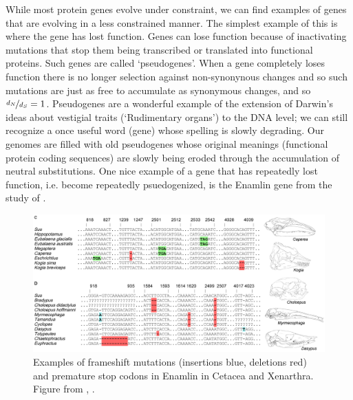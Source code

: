 While most protein genes evolve under constraint, we can find examples of
genes that are evolving in a less constrained manner. The simplest
example of this is where the gene has lost function. Genes can lose function because of inactivating mutations that stop them being transcribed or translated into functional proteins. Such genes are called `pseudogenes'.
When a gene completely loses function there is no longer
selection against non-synonynous changes and so such mutations are just as free
to accumulate as synonymous changes, and so $\nicefrac{d_N}{d_S}=1$.
Pseudogenes are a wonderful example of the extension of Darwin's ideas about vestigial traits (`Rudimentary organs') to the DNA level;
we can still recognize a once useful word (gene) whose spelling is slowly degrading. Our genomes are filled with old pseudogenes whose
original meanings (functional protein coding sequences) are slowly being eroded through the accumulation of neutral substitutions.
One nice example of a gene that has repeatedly lost function,
i.e. become repeatedly psuedogenized, is
the Enamlin gene from the study of \citet{Meredith:09}.

\begin{figure}
\begin{center}
\includegraphics[width=\textwidth]{Journal_figs/genetic_drift/Enamelin/Enamlin.pdf}
\end{center}
\caption{Examples of frameshift mutations (insertions blue, deletions
  red) and premature stop codons in Enamlin in Cetacea and
  Xenarthra. Figure from \citet{Meredith:09}, \PLOSccBY. } \label{fig:Enamlin_coding}
\end{figure}

